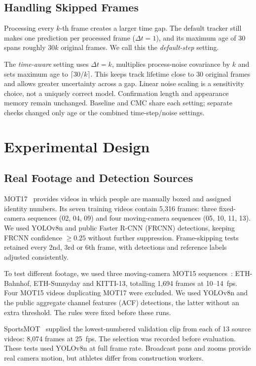 \documentclass[conference]{IEEEtran}
\begin{document}
\subsection{Handling Skipped Frames}
Processing every $k$-th frame creates a larger time gap. The default tracker still makes one prediction per processed frame ($\Delta t=1$), and its maximum age of 30 spans roughly $30k$ original frames. We call this the \emph{default-step} setting.

The \emph{time-aware} setting uses $\Delta t=k$, multiplies process-noise covariance by $k$ and sets maximum age to $\lceil30/k\rceil$. This keeps track lifetime close to 30 original frames and allows greater uncertainty across a gap. Linear noise scaling is a sensitivity choice, not a uniquely correct model. Confirmation length and appearance memory remain unchanged. Baseline and CMC share each setting; separate checks changed only age or the combined time-step/noise settings.

\section{Experimental Design}
\subsection{Real Footage and Detection Sources}
MOT17~\cite{milan2016mot16} provides videos in which people are manually boxed and assigned identity numbers. Its seven training videos contain 5,316 frames: three fixed-camera sequences (02, 04, 09) and four moving-camera sequences (05, 10, 11, 13). We used YOLOv8n and public Faster R-CNN (FRCNN) detections, keeping FRCNN confidence $\geq0.25$ without further suppression. Frame-skipping tests retained every 2nd, 3rd or 6th frame, with detections and reference labels adjusted consistently.

To test different footage, we used three moving-camera MOT15 sequences~\cite{lealtaixe2015mot15}: ETH-Bahnhof, ETH-Sunnyday and KITTI-13, totalling 1,694 frames at 10--14~fps. Four MOT15 videos duplicating MOT17 were excluded. We used YOLOv8n and the public aggregate channel features (ACF) detections, the latter without an extra threshold. The rules were fixed before these runs.

SportsMOT~\cite{cui2023sportsmot} supplied the lowest-numbered validation clip from each of 13 source videos: 8,074 frames at 25~fps. The selection was recorded before evaluation. These tests used YOLOv8n at full frame rate. Broadcast pans and zooms provide real camera motion, but athletes differ from construction workers.
\end{document}
